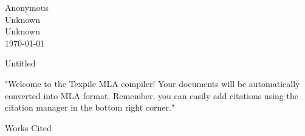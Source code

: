 \documentclass[12pt]{article}
\newenvironment{workscited}{\newpage\begin{center}Works Cited\end{center}}{\newpage}
\begin{document}
\noindent Anonymous\\Unknown\\Unknown\\\today\\
\begin{center}\textnormal{Untitled}\end{center}
\begin{flushleft}

\hspace{0.5in}"Welcome to the Texpile MLA compiler! Your documents will be automatically converted into MLA format. Remember, you can easily add citations using the citation manager in the bottom right corner."

\end{flushleft}
\begin{workscited}\printbibliography[heading=none]\end{workscited}
\end{document}

